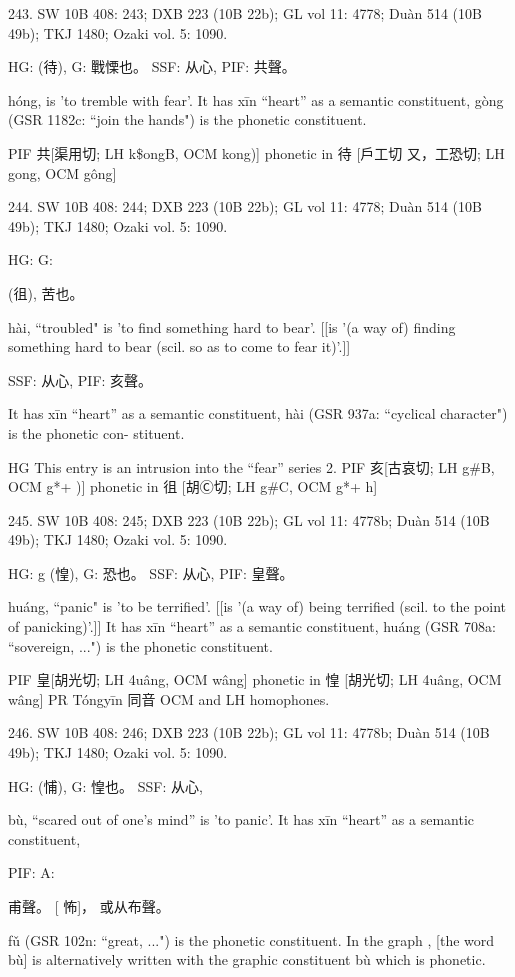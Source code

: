 243. SW 10B 408: 243; DXB 223 (10B 22b); GL vol 11: 4778; Duàn 514 (10B 49b); TKJ 1480; Ozaki vol. 5: 1090.


HG:	(待),
G:	戰慄也。
SSF: 从心,
PIF: 共聲。

hóng,
is 'to tremble with fear'.
It has xīn ``heart'' as a semantic constituent,
gòng (GSR 1182c: ``join the hands") is the phonetic constituent.

PIF     共[渠用切; LH k\$ongB, OCM kong)] phonetic in 待 [戶工切 又，工恐切; LH gong, OCM gông]


244. SW 10B 408: 244; DXB 223 (10B 22b); GL vol 11: 4778; Duàn 514 (10B 49b); TKJ 1480; Ozaki vol. 5: 1090.


HG:
G:

(徂),
苦也。

hài, ``troubled"
is 'to find something hard to bear'. [[is '(a way of) finding something hard to bear (scil. so as to come to fear it)'.]]




SSF: 从心,
PIF: 亥聲。

It has xīn ``heart'' as a semantic constituent,
hài (GSR 937a: ``cyclical character") is the phonetic con- stituent.

HG This entry is an intrusion into the ``fear'' series 2.
PIF     亥[古哀切; LH g\#B, OCM g*+ )] phonetic in 徂 [胡Ⓒ切; LH g\#C, OCM g*+ h]

245. SW 10B 408: 245; DXB 223 (10B 22b); GL vol 11: 4778b; Duàn 514 (10B 49b); TKJ 1480; Ozaki vol. 5: 1090.

HG: g (惶),
G:	恐也。
SSF: 从心,
PIF: 皇聲。


huáng, ``panic"
is 'to be terrified'. [[is '(a way of) being terrified (scil. to the point of panicking)'.]]
It has xīn ``heart'' as a semantic constituent,
huáng (GSR 708a: ``sovereign, ...") is the phonetic constituent.

PIF     皇[胡光切; LH 4uâng, OCM wâng] phonetic in 惶 [胡光切; LH 4uâng, OCM wâng]
PR	Tóngyīn 同音 OCM and LH homophones.

246. SW 10B 408: 246; DXB 223 (10B 22b); GL vol 11: 4778b; Duàn 514 (10B 49b); TKJ 1480; Ozaki vol. 5: 1090.


HG:	(悑),
G:	惶也。
SSF: 从心,

bù, ``scared out of one's mind'' is 'to panic'.
It has xīn ``heart'' as a semantic constituent,

PIF: A:

甫聲。
   [ 怖]， 或从布聲。

fǔ (GSR 102n: ``great, ...") is the phonetic constituent.
In the graph , [the word bù] is alternatively written with the graphic constituent bù which is phonetic.

